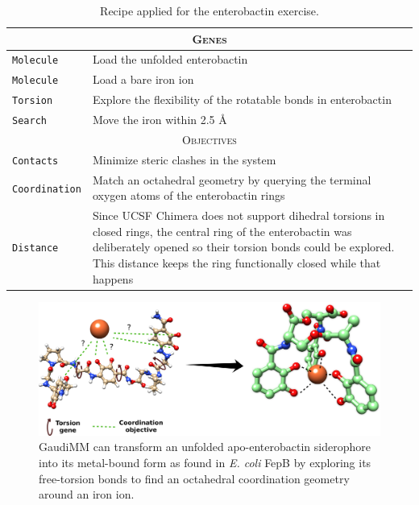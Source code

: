 \begin{table}[hbtp]
	\caption[Recipe applied for the enterobactin exercise]{Recipe applied for the enterobactin exercise.}
	\label{table:siderophore}
	\footnotesize
	\newcommand{\tableheading}[1]{\multicolumn{2}{c}{\textsc{#1}}}
	\begin{tabularx}{\textwidth}{RL}
		\toprule
		\tableheading{Genes}\\
		\toprule
		\texttt{Molecule} & Load the unfolded enterobactin\cite{Enterobactin} \\
		\midrule
		\texttt{Molecule} & Load a bare iron ion \\
		\midrule
		\texttt{Torsion} & Explore the flexibility of the rotatable bonds in enterobactin \\
		\midrule
		\texttt{Search} & Move the iron within 2.5 \AA \\
		\toprule
		\tableheading{Objectives}\\
		\toprule
		\texttt{Contacts} & Minimize steric clashes in the system \\
		\midrule
		\texttt{Coordination} & Match an octahedral geometry by querying the terminal oxygen atoms of the enterobactin rings \\
		\midrule
		\texttt{Distance} & Since UCSF Chimera does not support dihedral torsions in closed rings, the central ring of the enterobactin was deliberately opened so their torsion bonds could be explored. This distance keeps the ring functionally closed while that happens \\
		\bottomrule
	\end{tabularx}
\end{table}


\begin{figure}[hbtp] %
	\begin{Center}
		\includegraphics[width=\textwidth]{./figures/06/siderophore.png}
	\end{Center}
	\cprotect\caption[Siderophore folding]{GaudiMM can transform an unfolded apo-enterobactin siderophore into its metal-bound form as found in \textit{E. coli} FepB by exploring its free-torsion bonds to find an octahedral coordination geometry around an iron ion.}
	\label{fig:siderophore}
\end{figure}


